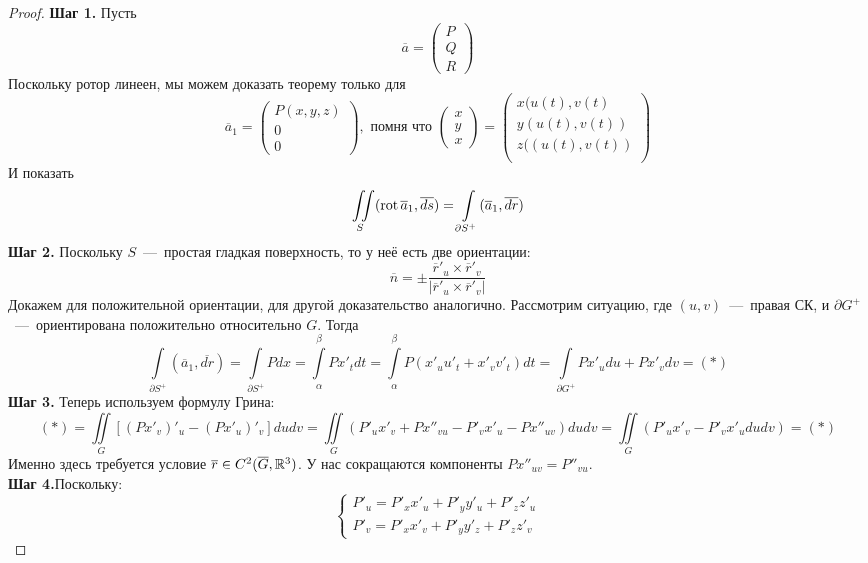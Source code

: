 \begin{proof}
    \textbf{Шаг 1.} Пусть \[\overline{a} = \begin{pmatrix}
        P \\ Q \\ R
    \end{pmatrix}\]
    Поскольку ротор линеен, мы можем доказать теорему только для \[\overline{a}_1 = \begin{pmatrix}
        P(x, y, z) \\ 0 \\ 0
    \end{pmatrix}, \text{ помня что } \begin{pmatrix}
        x \\y \\x
    \end{pmatrix} = \begin{pmatrix}
        x(u(t), v(t)\\ y(u(t), v(t))\\ z((u(t), v(t)) \\
    \end{pmatrix}\]
    И показать \[\iint\limits_S (\operatorname{rot} \overline{a}_1, \overline{ds}) = \int\limits_{\partial S^+} (\overline{a}_1, \overline{dr})\]
    \textbf{Шаг 2.} Поскольку $S$~---~простая гладкая поверхность, то у неё есть две ориентации: \[ \overline{n} = \pm \dfrac{\overline{r}'_u \times \overline{r}'_v}{|\overline{r}'_u \times \overline{r}'_v|}\]
    Докажем для положительной ориентации, для другой доказательство аналогично. Рассмотрим ситуацию, где $(u, v)$~---~правая СК, и $\partial G^+$~---~ориентирована положительно относительно $G$. Тогда \[\int\limits_{\partial S^+} (\overline{a}_1, \overline{dr}) = \int\limits_{\partial S^+} Pdx = \int\limits_\alpha^\beta Px'_tdt = \int\limits_\alpha^\beta P(x'_uu'_t + x'_vv'_t)dt = \int\limits_{\partial G^+} Px'_udu + Px'_vdv = (*)\]
    \textbf{Шаг 3.} Теперь используем формулу Грина: \[(*) = \iint\limits_G \left[(Px'_v)'_u - (Px'_u)'_v \right] dudv = \iint\limits_G (P'_ux'_v + Px''_{vu} - P'_vx'_u - Px''_{uv})dudv = \iint\limits_G (P'_ux'_v - P'_vx'_ududv) = (*)\]
    Именно здесь требуется условие $\overline{r} \in C^2(\overline{G}, \mathbb{R}^3)$. У нас сокращаются компоненты $Px''_{uv} = P''_{vu}$. \\
    \textbf{Шаг 4.}Поскольку: \begin{equation*}
        \begin{cases}
            P'_u = P'_xx'_u + P'_yy'_u + P'_zz'_u \\
            P'_v = P'_xx'_v + P'_yy'_z + P'_zz'_v

\end{cases}
\end{equation*}
\end{proof}
